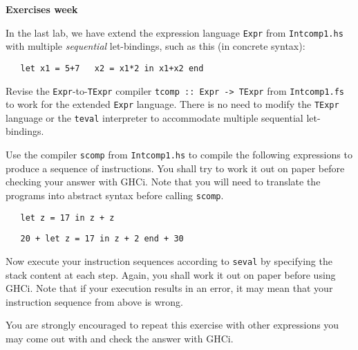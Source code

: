 \documentclass[a4paper]{article}
\begin{document}
\begin{center}
{\Large\bf Exercises week }\\[1ex]
\end{center}



\begin{exercise}\label{exer-multi-let-tcomp}
In the last lab, we have extend the expression language \texttt{Expr} from \texttt{Intcomp1.hs}
  with multiple \emph{sequential} let-bindings, such as this (in
  concrete syntax):

{\codesetup\begin{verbatim}
   let x1 = 5+7   x2 = x1*2 in x1+x2 end
\end{verbatim}}

  Revise the \texttt{Expr}-to-\texttt{TExpr} compiler \texttt{tcomp ::\ 
    Expr -> TExpr} from \texttt{Intcomp1.fs} to work for the extended
  \texttt{Expr} language.
  There is no need to modify the \texttt{TExpr} language or the
  \texttt{teval} interpreter to accommodate multiple sequential
  let-bindings.
\end{exercise}

\begin{exercise} 
Use the compiler \texttt{scomp} from \texttt{Intcomp1.hs} to compile the following 
expressions to produce a sequence of instructions. You shall try to work it out on paper before checking your answer with GHCi. 
Note that you will need to translate the programs into abstract syntax before calling \texttt{scomp}. 

{\codesetup\begin{verbatim}
   let z = 17 in z + z
\end{verbatim}}

{\codesetup\begin{verbatim}
   20 + let z = 17 in z + 2 end + 30
\end{verbatim}}

Now execute your instruction sequences according to \texttt{seval} by specifying the stack content at each step. Again, you shall work 
it out on paper before using GHCi. Note that if your execution results in an error, 
it may mean that your instruction sequence from above is wrong. 

You are strongly encouraged to repeat this exercise with other expressions you may come out with and check the answer with GHCi.\\
\end{exercise}
\end{document}
